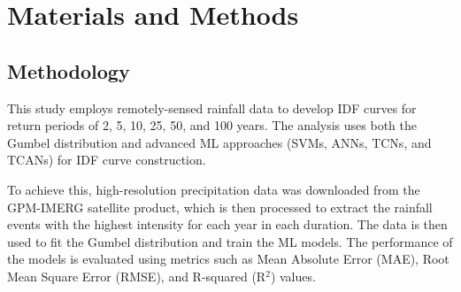 \section{Materials and Methods}
\subsection{Methodology}
This study employs remotely-sensed rainfall data to develop IDF curves for return periods of 2, 5, 10, 25, 50, and 100 years. The analysis uses both the Gumbel distribution and advanced ML approaches (SVMs, ANNs, TCNs, and TCANs) for IDF curve construction.

\vspace{1em}

To achieve this, high-resolution precipitation data was downloaded from the GPM-IMERG satellite product, which is then processed to extract the rainfall events with the highest intensity for each year in each duration. The data is then used to fit the Gumbel distribution and train the ML models. The performance of the models is evaluated using metrics such as Mean Absolute Error (MAE), Root Mean Square Error (RMSE), and R-squared (R$^{2}$) values.





